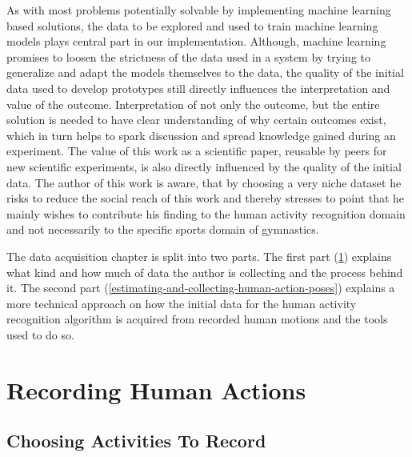 As with most problems potentially solvable by implementing machine learning based solutions, the data to be explored and used to train machine learning models plays central part in our implementation. Although, machine learning promises to loosen the strictness of the data used in a system by trying to generalize and adapt the models themselves to the data, the quality of the initial data used to develop prototypes still directly influences the interpretation and value of the outcome. Interpretation of not only the outcome, but the entire solution is needed to have clear understanding of why certain outcomes exist, which in turn helps to spark discussion and spread knowledge gained during an experiment. The value of this work as a scientific paper, reusable by peers for new scientific experiments, is also directly influenced by the quality of the initial data. The author of this work is aware, that by choosing a very niche dataset he risks to reduce the social reach of this work and thereby stresses to point that he mainly wishes to contribute his finding to the human activity recognition domain and not necessarily to the specific sports domain of gymnastics.

The data acquisition chapter is split into two parts. The first part (\ref{recording-human-actions}) explains what kind and how much of data the author is collecting and the process behind it. The second part (\ref{estimating-and-collecting-human-action-poses}) explains a more technical approach on how the initial data for the human activity recognition algorithm is acquired from recorded human motions and the tools used to do so.

\section{Recording Human Actions}
\label{recording-human-actions}

\subsection{Choosing Activities To Record}

